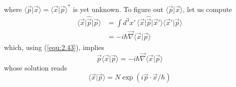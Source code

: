 where $\langle \vec{p}\vert \vec{x}\rangle  = \langle \vec{x}\vert \vec{p}\rangle ^*$ is yet
unknown. To figure out $\langle \vec{p}\vert \vec{x}\rangle $, let us compute
\begin{align}
  \langle \vec{x}\vert \hat{\vec{p}}\vert \vec{p}\rangle  &= \int d^3 x' \,
  \langle \vec{x}\vert \hat{\vec{p}}\vert \vec{x}'\rangle 
  \langle \vec{x}'\vert \vec{p}\rangle \nonumber\\
  &= -i\hbar \vec{\nabla} \langle \vec{x}\vert \vec{p}\rangle  \label{equ:2.51}
\end{align}
which, using (\ref{equ:2.43}), implies
\begin{equation}
  \vec{p} \langle \vec{x}\vert \vec{p}\rangle  = -i \hbar
  \vec{\nabla}\langle \vec{x}\vert \vec{p}\rangle 
  \label{equ:2.52}
\end{equation}
whose solution reads
\begin{equation}
  \langle \vec{x}\vert \vec{p}\rangle  = N \exp(i \vec{p} \cdot \vec{x}/\hbar)
  \label{equ:2.53}
\end{equation}

